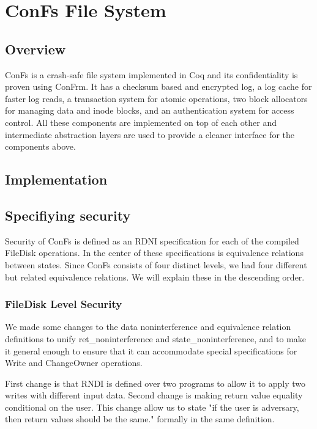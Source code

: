 \chapter{ConFs File System}

\section{Overview}
ConFs is a crash-safe file system implemented in Coq and its confidentiality is proven using ConFrm. It has a checksum based and encrypted log, a log cache for faster log reads, a transaction system for atomic operations, two block allocators for managing data and inode blocks, and an authentication system for access control. All these components are implemented on top of each other and intermediate abstraction layers are used to provide a cleaner interface for the components above.

\section{Implementation}

\section{Specifiying security}
Security of ConFs is defined as an RDNI specification for each of the compiled FileDisk operations. In the center of these specifications is equivalence relations between states. Since ConFs consists of four distinct levels, we had four different but related equivalence relations. We will explain these in the descending order.

\subsection{FileDisk Level Security}
We made some changes to the data noninterference and equivalence relation definitions to unify ret\_noninterference and state\_noninterference, and to make it general enough to ensure that it can accommodate special specifications for Write and ChangeOwner operations.

First change is that RNDI is defined over two programs to allow it to apply two writes with different input data. Second change is making return value equality conditional on the user. This change allow us to state "if the user is adversary, then return values should be the same." formally in the same definition.

